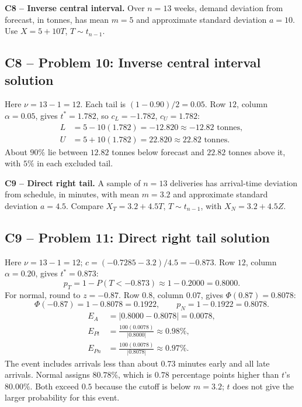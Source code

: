 {
\textbf{C8 -- Inverse central interval.} Over $n=13$ weeks, demand deviation from forecast, in tonnes, has mean $m=5$ and approximate standard deviation $a=10$. Use $X=5+10T$, $T\sim t_{n-1}$.
\label{sol:q10}
\subsection*{C8 -- Problem 10: Inverse central interval solution }
Here $\nu=13-1=12$. Each tail is $(1-0.90)/2=0.05$.
Row $12$, column $\alpha=0.05$, gives $t^*=1.782$, so $c_L=-1.782$, $c_U=1.782$:
\[
 \begin{aligned}
 L&=5-10(1.782)=-12.820\approx\boxed{-12.82\text{ tonnes}},\\
 U&=5+10(1.782)=22.820\approx\boxed{22.82\text{ tonnes}}.
 \end{aligned}
\]
About $90\%$ lie between $12.82$ tonnes below forecast and $22.82$ tonnes above it, with $5\%$ in each excluded tail.
\secInicio[sec:q10]
}

{
\textbf{C9 -- Direct right tail.} A sample of $n=13$ deliveries has arrival-time deviation from schedule, in minutes, with mean $m=3.2$ and approximate standard deviation $a=4.5$. Compare $X_T=3.2+4.5T$, $T\sim t_{n-1}$, with $X_N=3.2+4.5Z$.
\label{sol:q11}
\subsection*{C9 -- Problem 11: Direct right tail solution }
Here $\nu=13-1=12$; $c=(-0.7285-3.2)/4.5=-0.873$.
Row $12$, column $\alpha=0.20$, gives $t^*=0.873$:
\[
 p_T=1-P(T<-0.873)\approx1-0.2000=\boxed{0.8000}.
\]
For normal, round to $z=-0.87$.
Row $0.8$, column $0.07$, gives $\Phi(0.87)=0.8078$:
\[
 \Phi(-0.87)=1-0.8078=0.1922,\qquad p_N=1-0.1922=\boxed{0.8078}.
\]
\[
 \begin{aligned}
 E_A&=|0.8000-0.8078|=\boxed{0.0078},\\
 E_{Pt}&=\frac{100(0.0078)}{|0.8000|}\approx\boxed{0.98\%},\\
 E_{Pn}&=\frac{100(0.0078)}{|0.8078|}\approx\boxed{0.97\%}.
 \end{aligned}
\]
The event includes arrivals less than about $0.73$ minutes early and all late arrivals.
Normal assigns $80.78\%$, which is $0.78$ percentage points higher than $t$'s $80.00\%$.
Both exceed $0.5$ because the cutoff is below $m=3.2$; $t$ does not give the larger probability for this event.
\secInicio[sec:q11]
}


